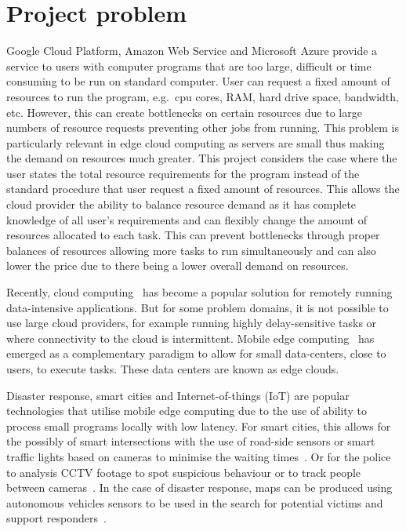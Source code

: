 \chapter{Project problem}\label{ch:project-problem}
Google Cloud Platform, Amazon Web Service and Microsoft Azure provide a service to users with computer programs that
are too large, difficult or time consuming to be run on standard computer. User can request a fixed amount of resources
to run the program, e.g.\ cpu cores, RAM, hard drive space, bandwidth, etc. However,
this can create bottlenecks on certain resources due to large numbers of resource requests preventing other jobs from
running. This problem is particularly relevant in edge cloud computing as servers
are small thus making the demand on resources much greater. This project considers the case where the user states
the total resource requirements for the program instead of the standard procedure that user request a fixed
amount of resources. This allows the cloud provider the ability to balance resource demand as it has
complete knowledge of all user's requirements and can flexibly change the amount of resources allocated to each
task. This can prevent bottlenecks through proper balances of resources allowing more tasks to run simultaneously
and can also lower the price due to there being a lower overall demand on resources.

Recently, cloud computing~\citep{cloud_cite} has become a popular solution for remotely running data-intensive
applications. But for some problem domains, it is not possible to use large cloud providers, for example running highly
delay-sensitive tasks or where connectivity to the cloud is intermittent.
Mobile edge computing~\citep{mobile_edge_survey} has emerged as a complementary paradigm to allow for small
data-centers, close to users, to execute tasks. These data centers are known as edge clouds.

Disaster response, smart cities and Internet-of-things (IoT) are popular technologies that utilise mobile edge
computing due to the use of ability to process small programs locally with low latency. For smart cities, this
allows for the possibly of smart intersections with the use of road-side sensors or smart traffic lights based
on cameras to minimise the waiting times~\citep{smart_cities_traffic_lights}. Or for the police to analysis
CCTV footage to spot suspicious behaviour or to track people between cameras~\citep{Sreenu2019}. In the case
of disaster response, maps can be produced using autonomous vehicles sensors to be used in the search for potential
victims and support responders~\citep{smart_disaster_management}.

